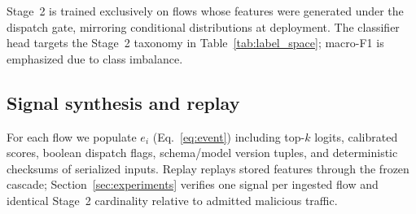 Stage~2 is trained exclusively on flows whose features were generated under the dispatch gate, mirroring conditional distributions at deployment.
The classifier head targets the Stage~2 taxonomy in Table~\ref{tab:label_space}; macro-F1 is emphasized due to class imbalance.

\subsection{Signal synthesis and replay}

For each flow we populate $e_i$ (Eq.~\eqref{eq:event}) including top-$k$ logits, calibrated scores, boolean dispatch flags, schema/model version tuples, and deterministic checksums of serialized inputs.
Replay replays stored features through the frozen cascade; Section~\ref{sec:experiments} verifies one signal per ingested flow and identical Stage~2 cardinality relative to admitted malicious traffic.
